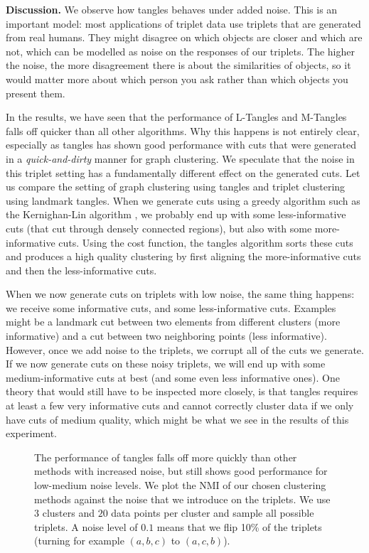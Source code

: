 \noindent
\textbf{Discussion.}
We observe how tangles behaves under added noise. This is an important model: most applications of triplet data use triplets that are generated from
real humans. They might disagree on which objects are closer and which are not, which can be modelled as noise on the responses of our triplets. The higher the noise, 
the more disagreement there is about the similarities of objects, so it would matter more about which person you ask rather than which objects you present them. 

In the results, we have seen that the performance of L-Tangles and M-Tangles falls off quicker than all other algorithms. Why this happens is not entirely clear, especially 
as tangles has shown good performance with cuts that were generated in a \textit{quick-and-dirty} manner for graph clustering.
We speculate that the noise in this triplet setting has a fundamentally different effect on the generated cuts. Let us compare the setting of
graph clustering using tangles and triplet clustering using landmark tangles. When we generate cuts using a greedy algorithm such as the Kernighan-Lin algorithm \citep{kernighanbrianwilsonEfficientHeuristicProcedure1970}, we probably end up with some less-informative cuts (that cut through densely connected regions), but also with some more-informative cuts. 
Using the cost function, the tangles algorithm sorts these cuts and produces a high quality clustering by first aligning the more-informative cuts and then the less-informative cuts. 

When we now generate cuts on triplets with low noise, the same thing happens: we receive some informative cuts, 
and some less-informative cuts. Examples might be a landmark cut between two elements from different clusters (more informative) and
a cut between two neighboring points (less informative). However, once we add noise to the triplets, we corrupt all of the cuts we generate. If we now generate cuts on these noisy triplets, we will 
end up with some medium-informative cuts at best (and some even less informative ones). 
One theory that would still have to be inspected more closely, is that tangles requires at least a few very informative cuts and
cannot correctly cluster data if we only have cuts of medium quality, which might be what we see in the results of this experiment.


\begin{figure}[ht]
    \centering
    \resizebox{0.7\textwidth}{!}{}
    \caption{
        The performance of tangles falls off more quickly than other methods with increased noise, but still shows good performance for low-medium noise levels.
        We plot the NMI of our chosen clustering methods against the noise that we introduce on 
        the triplets.
        We use $3$ clusters and $20$ data points per cluster and sample all possible triplets. A noise level of $0.1$ means that we flip 10\% of the triplets (turning for example $(a,b,c)$ to $(a,c,b)$). 
    }
    \label{fig:adding-noise}
\end{figure}

